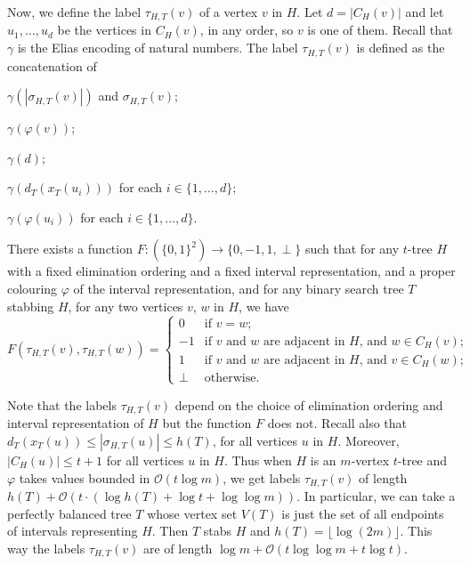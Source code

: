 \documentclass[kpfonts]{patmorin}
\newcommand{\Oh}{\mathcal{O}}
\let\le\leqslant
\let\leq\leqslant
\begin{document}
Now, we define the label $\tau_{H,T}(v)$ of a vertex $v$ in $H$. 
Let $d=|C_H(v)|$ and let $u_1,\dots, u_d$ be the vertices in $C_H(v)$, in any order, so $v$ is one of them. 
Recall that $\gamma$ is the Elias encoding of natural numbers.
The label $\tau_{H,T}(v)$ is defined 
as the concatenation of
\begin{compactenum}[(T1)]
  \item $\gamma(|\sigma_{H,T}(v)|)$ and $\sigma_{H,T}(v)$;
  \item $\gamma(\varphi(v))$;
  \item $\gamma(d)$;
  \item $\gamma(d_{T}(x_T(u_i)))$ for each $i\in\{1,\dots,d\}$;
  \item $\gamma(\varphi(u_i))$ for each $i\in\{1,\dots,d\}$.
  \end{compactenum}

\begin{lem}
  There exists a function $F:(\{0,1\}^2)\to\{0,-1,1,\perp\}$ such that
  for any $t$-tree $H$ 
  with a fixed elimination ordering and a fixed interval representation, 
  and a proper colouring $\varphi$ of the interval representation, and 
  for any binary search tree $T$ stabbing $H$,
  for any two vertices $v$, $w$ in $H$, we have
  \[
      F(\tau_{H,T}(v),\tau_{H,T}(w)) = \begin{cases}
      0 & \text{if $v=w$;} \\
      -1 & \text{if $v$ and $w$ are adjacent in $H$, and $w\in C_H(v)$;} \\
      1 & \text{if $v$ and $w$ are adjacent in $H$, and $v\in C_H(w)$;} \\
      \perp & \text{otherwise.}
    \end{cases}
  \]
\end{lem}
Note that the labels $\tau_{H,T}(v)$ depend on the choice of elimination ordering and interval representation of $H$ but the function $F$ does not.
Recall also that $d_T(x_T(u)) \le |\sigma_{H,T}(u)|\leq h(T)$, for all vertices $u$ in $H$. 
Moreover, $|C_H(u)|\leq t+1$ for all vertices $u$ in $H$. 
Thus when $H$ is an $m$-vertex $t$-tree and $\varphi$ takes values bounded in $\Oh(t\log m)$, 
we get labels $\tau_{H,T}(v)$ of length
$h(T) + \Oh(t\cdot (\log h(T) + \log t + \log\log m))$.
In particular, we can take a perfectly balanced tree $T$ whose vertex set $V(T)$ is just the set of all endpoints of intervals representing $H$.
Then $T$ stabs $H$ and $h(T)=\lfloor\log(2m)\rfloor$. 
This way the labels $\tau_{H,T}(v)$ are of length $\log m + \Oh(t\log\log m +t\log t)$.
\end{document}

